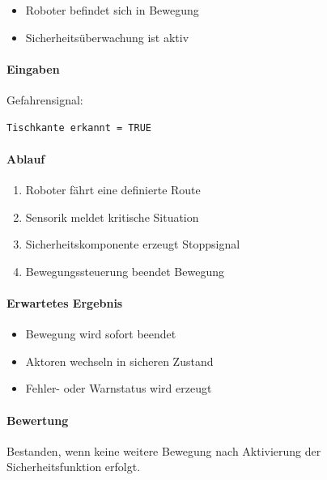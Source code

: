 \begin{itemize}
\tightlist
\item
  Roboter befindet sich in Bewegung
\item
  Sicherheitsüberwachung ist aktiv
\end{itemize}

\paragraph{Eingaben}\label{eingaben-12}

Gefahrensignal:

\begin{verbatim}
Tischkante erkannt = TRUE
\end{verbatim}

\paragraph{Ablauf}\label{ablauf-12}

\begin{enumerate}
\def\labelenumi{\arabic{enumi}.}
\tightlist
\item
  Roboter fährt eine definierte Route
\item
  Sensorik meldet kritische Situation
\item
  Sicherheitskomponente erzeugt Stoppsignal
\item
  Bewegungssteuerung beendet Bewegung
\end{enumerate}

\paragraph{Erwartetes Ergebnis}\label{erwartetes-ergebnis-12}

\begin{itemize}
\tightlist
\item
  Bewegung wird sofort beendet
\item
  Aktoren wechseln in sicheren Zustand
\item
  Fehler- oder Warnstatus wird erzeugt
\end{itemize}

\paragraph{Bewertung}\label{bewertung-12}

Bestanden, wenn keine weitere Bewegung nach Aktivierung der
Sicherheitsfunktion erfolgt.

